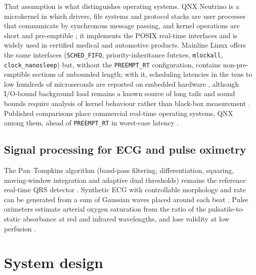 \documentclass[preprint,3p,10pt]{elsarticle}
\begin{document}
That assumption is what distinguishes operating systems. QNX Neutrino is a microkernel in which drivers, file systems and protocol stacks are user processes that communicate by synchronous message passing, and kernel operations are short and pre-emptible \cite{hildebrand1992}; it implements the POSIX real-time interfaces \cite{posix2017} and is widely used in certified medical and automotive products. Mainline Linux offers the same interfaces (\texttt{SCHED\_FIFO}, priority-inheritance futexes, \texttt{mlockall}, \texttt{clock\_nanosleep}) but, without the \texttt{PREEMPT\_RT} configuration, contains non-pre-emptible sections of unbounded length; with it, scheduling latencies in the tens to low hundreds of microseconds are reported on embedded hardware \cite{reghenzani2019,adam2021}, although I/O-bound background load remains a known source of long tails \cite{cerqueira2013} and sound bounds require analysis of kernel behaviour rather than black-box measurement \cite{bristot2020}. Published comparisons place commercial real-time operating systems, QNX among them, ahead of \texttt{PREEMPT\_RT} in worst-case latency \cite{fayyad2013}.

\subsection{Signal processing for ECG and pulse oximetry}
The Pan--Tompkins algorithm (band-pass filtering, differentiation, squaring, moving-window integration and adaptive dual thresholds) remains the reference real-time QRS detector \cite{pan1985}. Synthetic ECG with controllable morphology and rate can be generated from a sum of Gaussian waves placed around each beat \cite{mcsharry2003}. Pulse oximeters estimate arterial oxygen saturation from the ratio of the pulsatile-to-static absorbance at red and infrared wavelengths, and lose validity at low perfusion \cite{jubran2015}.

\section{System design}
\end{document}
